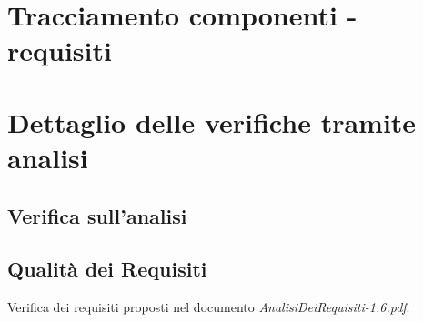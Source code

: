 \section{Tracciamento componenti - requisiti}

\section{Dettaglio delle verifiche tramite analisi}

\subsection{Verifica sull'analisi}

\subsection*{Qualit\`a dei Requisiti}

Verifica dei requisiti proposti nel documento
\emph{AnalisiDeiRequisiti-1.6.pdf}.

